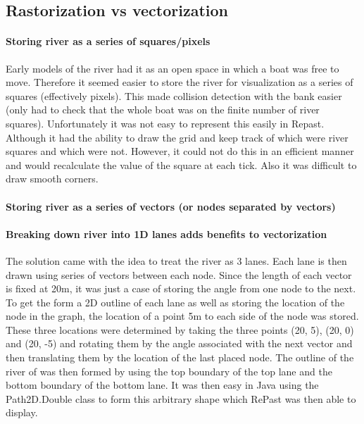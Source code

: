     \subsection{Rastorization vs vectorization}
    
      \paragraph{Storing river as a series of squares/pixels}
      Early models of the river had it as an open space in which a boat was free to move. Therefore it seemed easier to store the river for visualization as a series of squares (effectively pixels). This made collision detection with the bank easier (only had to check that the whole boat was on the finite number of river squares). Unfortunately it was not easy to represent this easily in Repast. Although it had the ability to draw the grid and keep track of which were river squares and which were not. However, it could not do this in an efficient manner and would recalculate the value of the square at each tick. Also it was difficult to draw smooth corners.
      
      \paragraph{Storing river as a series of vectors (or nodes separated by vectors)}
      \paragraph{Breaking down river into 1D lanes adds benefits to vectorization}
      The solution came with the idea to treat the river as 3 lanes. Each lane is then drawn using series of vectors between each node. Since the length of each vector is fixed at 20m, it was just a case of storing the angle from one node to the next. To get the form a 2D outline of each lane as well as storing the location of the node in the graph, the location of a point 5m to each side of the node was stored. These three locations were determined by taking the three points (20, 5), (20, 0) and (20, -5) and rotating them by the angle associated with the next vector and then translating them by the location of the last placed node. The outline of the river of was then formed by using the top boundary of the top lane and the bottom boundary of the bottom lane. It was then easy in Java using the Path2D.Double class to form this arbitrary shape which RePast was then able to display.
      
